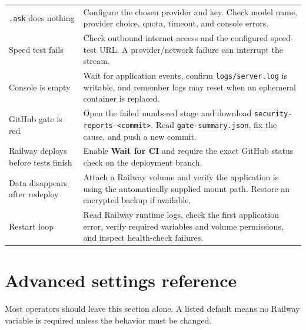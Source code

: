 \documentclass[11pt,a4paper]{article}
\begin{document}
\begin{longtable}{p{}p{}}
\texttt{.ask} does nothing & Configure the chosen provider and key. Check model name, provider choice, quota, timeout, and console errors.\\
Speed test fails & Check outbound internet access and the configured speed-test URL. A provider/network failure can interrupt the stream.\\
Console is empty & Wait for application events, confirm \texttt{logs/server.log} is writable, and remember logs may reset when an ephemeral container is replaced.\\
GitHub gate is red & Open the failed numbered stage and download \texttt{security-reports-<commit>}. Read \texttt{gate-summary.json}, fix the cause, and push a new commit.\\
Railway deploys before tests finish & Enable \textbf{Wait for CI} and require the exact GitHub status check on the deployment branch.\\
Data disappears after redeploy & Attach a Railway volume and verify the application is using the automatically supplied mount path. Restore an encrypted backup if available.\\
Restart loop & Read Railway runtime logs, check the first application error, verify required variables and volume permissions, and inspect health-check failures.\\
\bottomrule
\end{longtable}

\section{Advanced settings reference}

Most operators should leave this section alone. A listed default means no Railway variable is required unless the behavior must be changed.
\end{document}
